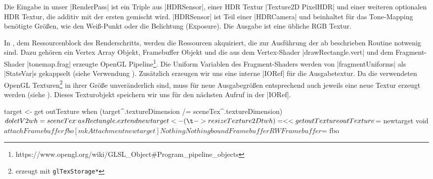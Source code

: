 Die Eingabe in unser |RenderPass| ist ein Triple aus |HDRSensor|, einer HDR Textur |Texture2D PixelHDR| und einer weiteren optionalen HDR Textur, die additiv mit der ersten gemischt wird. |HDRSensor| ist Teil einer |HDRCamera| und beinhaltet für das Tone-Mapping benötigte Größen, wie den Weiß-Punkt oder die Belichtung (Exposure). Die Ausgabe ist eine übliche RGB Textur.


In , dem Ressourcenblock des Renderschritts, werden die Ressourcen akquiriert, die zur Ausführung der ab  beschrieben Routine notwenig sind. Dazu gehören ein Vertex Array Objekt, Framebuffer Objekt und die aus dem Vertex-Shader |drawRectangle.vert| und dem Fragment-Shader |tonemap.frag| erzeugte OpenGL Pipeline\footnote{https://www.opengl.org/wiki/GLSL\_Object\#Program\_pipeline\_objects}. Die Uniform Variablen des Fragment-Shaders werden von |fragmentUniforms| als |StateVar|s gekappselt (siehe Verwendung ). Zusätzlich erzeugen wir uns eine interne |IORef| für die Ausgabetextur. Da die verwendeten OpenGL Texturen\footnote{erzeugt mit \texttt{glTexStorage*}} in ihrer Größe unveränderlich sind, muss für neue Ausgabegrößen entsprechend auch jeweils eine neue Textur erzeugt werden (siehe ). Dieses Texturobjekt speichern wir uns für den nächsten Aufruf in der |IORef|.

\begin{haskell}[label={lst:tonemap-pass-run-reize},caption={\texttt{ToneMapPass} Größenanpassung des Framebuffers},nolol,float,floatplacement=H]
    target <- get outTexture
    when (target^.textureDimension /= sceneTex^.textureDimension) $ do
      let V2 w h = sceneTex^.asRectangle.extend
      newtarget <- (\t -> resizeTexture2D t w h) =<< get outTexture
      outTexture $= newtarget
      void $ attachFramebuffer fbo [mkAttachment newtarget] Nothing Nothing
    boundFramebuffer RWFramebuffer $= fbo
\end{haskell}

